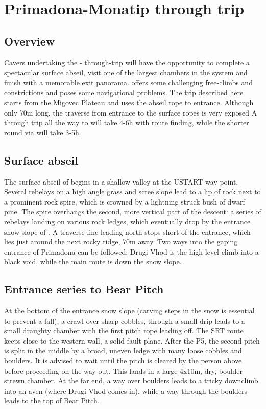 \section{Primadona-Monatip through trip}

\subsection{Overview}
Cavers undertaking the - through-trip will have the opportunity to complete a spectacular surface abseil, visit one of the largest chambers in the system and finish with a memorable exit panorama.  offers some challenging free-climbs and constrictions and poses some navigational problems. The trip described here starts from the Migovec Plateau and uses the abseil rope to  entrance. Although only 70m long, the traverse from  entrance to the surface ropes is very exposed A through trip all the way to  will take 4-6h with route finding, while the shorter round via  will take 3-5h. 

\subsection{Surface abseil}
The surface abseil of  begins in a shallow valley at the USTART way point. Several rebelays on a high angle grass and scree slope lead to a lip of rock next to a prominent rock spire, which is crowned by a lightning struck bush of dwarf pine. The spire overhangs the second, more vertical part of the descent: a series of rebelays landing on various rock ledges, which eventually drop by the entrance snow slope of . A traverse line leading north stops short of the  entrance, which lies just around the next rocky ridge, 70m away. Two ways into the gaping entrance of Primadona can be followed: Drugi Vhod is the high level climb into a black void, while the main route is down the snow slope.

\subsection{Entrance series to Bear Pitch}
At the bottom of the entrance snow slope (carving steps in the snow is essential to prevent a fall), a crawl over sharp cobbles, through a small drip leads to a small draughty chamber with the first pitch rope leading off. The SRT route keeps close to the western wall, a solid fault plane. After the P5, the second pitch is split in the middle by a broad, uneven ledge with many loose cobbles and boulders. It is advised to wait until the pitch is cleared by the person above before proceeding on the way out. This lands in a large 4x10m, dry, boulder strewn chamber. At the far end, a way over boulders leads to a tricky downclimb into an aven (where Drugi Vhod comes in), while a way through the boulders leads to the top of Bear Pitch.

